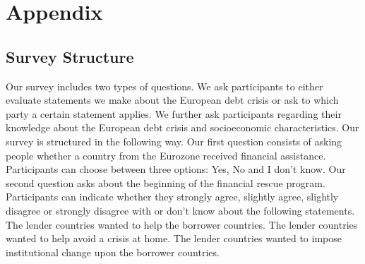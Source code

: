 \section{Appendix}
\subsection{Survey Structure}
Our survey includes two types of questions. We ask participants to either evaluate statements we make about the European debt crisis or ask to which party a certain statement applies. We further ask participants regarding their knowledge about the European debt crisis and socioeconomic characteristics. Our survey is structured in the following way. Our first question consists of asking people whether a country from the Eurozone received financial assistance. Participants can choose between three options: Yes, No and I don't know. Our second question asks about the beginning of the financial rescue program. 
Participants can indicate whether they strongly agree, slightly agree, slightly disagree or strongly disagree with or don't know about the following statements. 
The lender countries wanted to help the borrower countries. The lender countries wanted to help avoid a crisis at home. The lender countries wanted to impose institutional change upon the borrower countries. 
